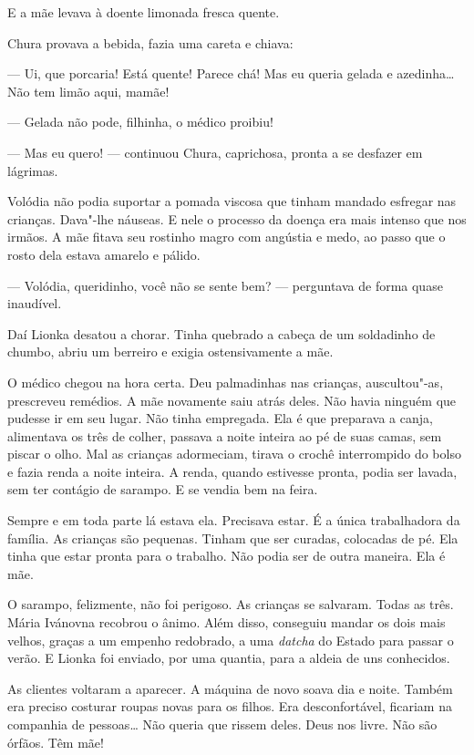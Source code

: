 E a mãe levava à doente limonada fresca quente.


Chura provava a bebida, fazia uma careta e chiava:

--- Ui, que porcaria! Está quente! Parece chá! Mas eu queria gelada e
azedinha\ldots{} Não tem limão aqui, mamãe!

--- Gelada não pode, filhinha, o médico proibiu!

--- Mas eu quero! --- continuou Chura, caprichosa, pronta a se desfazer
em lágrimas.

Volódia não podia suportar a pomada viscosa que tinham mandado esfregar
nas crianças. Dava"-lhe náuseas. E nele o processo da doença era mais
intenso que nos irmãos. A mãe fitava seu rostinho magro com angústia e medo, ao
passo que o rosto dela estava amarelo e pálido.

--- Volódia, queridinho, você não se sente bem? --- perguntava de forma
quase inaudível.

Daí Lionka desatou a chorar. Tinha quebrado a cabeça de um soldadinho de
chumbo, abriu um berreiro e exigia ostensivamente a mãe.

O médico chegou na hora certa. Deu palmadinhas nas crianças,
auscultou"-as, prescreveu remédios. A mãe novamente saiu atrás deles. Não
havia ninguém que pudesse ir em seu lugar. Não tinha empregada. Ela é
que preparava a canja, alimentava os três de colher, passava a noite
inteira ao pé de suas camas, sem piscar o olho. Mal as crianças
adormeciam, tirava o crochê interrompido do bolso e fazia renda a noite
inteira. A renda, quando estivesse pronta, podia ser lavada, sem ter
contágio de sarampo. E se vendia bem na feira.

Sempre e em toda parte lá estava ela. Precisava estar. É a única
trabalhadora da família. As crianças são pequenas. Tinham que ser
curadas, colocadas de pé. Ela tinha que estar pronta para o trabalho.
Não podia ser de outra maneira. Ela é mãe.

\asterisc

O sarampo, felizmente, não foi perigoso. As crianças se salvaram. Todas
as três. Mária Ivánovna recobrou o ânimo. Além disso, conseguiu mandar
os dois mais velhos, graças a um empenho redobrado, a uma
\emph{datcha} do Estado para passar o verão. E Lionka foi enviado, por
uma quantia, para a aldeia de uns conhecidos.

As clientes voltaram a aparecer. A máquina de novo soava dia e noite.
Também era preciso costurar roupas novas para os filhos. Era
desconfortável, ficariam na companhia de pessoas\ldots{} Não queria que
rissem deles. Deus nos livre. Não são órfãos. Têm mãe!

